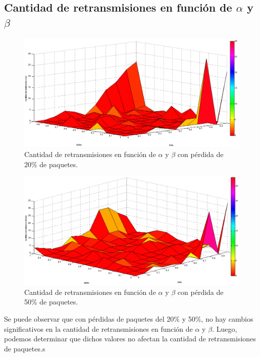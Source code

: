\documentclass[10pt, a4paper]{article}
\begin{document}
\subsection{Cantidad de retransmisiones en función de $\alpha$ y $\beta$}

\begin{figure}[H]
\begin{center}
\includegraphics[width=17cm]{alphaBetaRetransmision0,2.png}
\caption{Cantidad de retransmisiones en función de $\alpha$ y $\beta$ con pérdida de 20\% de paquetes.}
\end{center}
\end{figure}


\begin{figure}[H]
\begin{center}
\includegraphics[width=17cm]{alphaBetaRetransmision0,5.png}
\caption{Cantidad de retransmisiones en función de $\alpha$ y $\beta$ con pérdida de 50\% de paquetes.}
\end{center}
\end{figure}

Se puede observar que con pérdidas de paquetes del 20\% y 50\%, no hay cambios significativos en la cantidad de retransmisiones en función de $\alpha$ y $\beta$. Luego, podemos determinar que dichos valores no afectan la cantidad de retransmisiones de paquetes.s
\end{document}

